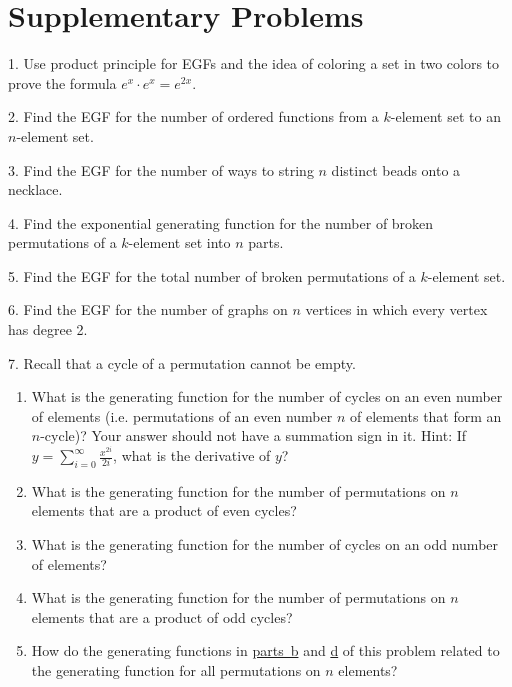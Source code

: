 \documentclass[10pt,]{book}
\theoremstyle{plain}
\theoremstyle{definition}
\theoremstyle{definition}
\numberwithin{equation}{chapter}
\begin{document}
\section[{Supplementary Problems}]{Supplementary Problems}\label{app3-suppprobs}
\begin{exerciselist}
\item[1.]\hypertarget{exercise-68}{}Use product principle for EGFs and the idea of coloring a set in two colors to prove the formula \(e^x\cdot e^x = e^{2x}.\)%
\par\smallskip
\item[2.]\hypertarget{exercise-69}{}Find the EGF for the number of ordered functions from a \(k\)-element set to an \(n\)-element set.%
\par\smallskip
\item[3.]\hypertarget{exercise-70}{}Find the EGF for the number of ways to string \(n\) distinct beads onto a necklace.%
\par\smallskip
\item[4.]\hypertarget{exercise-71}{}Find the exponential generating function for the number of broken permutations of a \(k\)-element set into \(n\) parts.%
\par\smallskip
\item[5.]\hypertarget{exercise-72}{}Find the EGF for the total number of broken permutations of a \(k\)-element set.%
\par\smallskip
\item[6.]\hypertarget{exercise-73}{}Find the EGF for the number of graphs on \(n\) vertices in which every vertex has degree 2.%
\par\smallskip
\item[7.]\hypertarget{exercise-74}{}Recall that a cycle of a permutation cannot be empty. \leavevmode%
\begin{enumerate}[label=(\alph*)]
\item\hypertarget{li-141}{}What is the generating function for the number of cycles on an even number of elements (i.e. permutations of an even number \(n\) of elements that form an \(n\)-cycle)?  Your answer should not have a summation sign in it.  Hint: If \(y=
\sum_{i=0}^\infty \frac{x^{2i}}{2i}\), what is the derivative of \(y\)?%
\item\hypertarget{EGF-perm-even-cycles}{}What is the generating function for the number of permutations on \(n\) elements that are a product of even cycles?%
\item\hypertarget{li-143}{}What is the generating function for the number of cycles on an odd number of elements?%
\item\hypertarget{EGF-perm-odd-cycles}{}What is the generating function for the number of permutations on \(n\) elements that are a product of odd cycles?%
\item\hypertarget{li-145}{}How do the generating functions in \hyperlink{EGF-perm-even-cycles}{parts~b} and \hyperlink{EGF-perm-odd-cycles}{d} of this problem related to the generating function for all permutations on \(n\) elements?%
\end{enumerate}
%
\par\smallskip
\end{exerciselist}
%
\backmatter
%
%
\printindex
%
\end{document}
